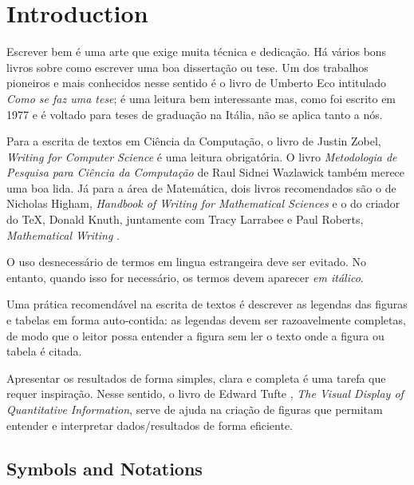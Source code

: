 \chapter{Introduction}
\label{cap:introduction}

Escrever bem é uma arte que exige muita técnica e dedicação. Há vários bons livros
sobre como escrever uma boa dissertação ou tese. Um dos trabalhos pioneiros e mais
conhecidos nesse sentido é o livro de Umberto Eco \cite{eco:09} intitulado 
\emph{Como se faz uma tese}; é uma leitura bem interessante mas, como foi escrito 
em 1977 e é voltado para teses de graduação na Itália, não se aplica tanto a nós.

Para a escrita de textos em Ciência da Computação, o livro de Justin Zobel, 
\emph{Writing for Computer Science} \cite{zobel:04} é uma leitura obrigatória. 
O livro \emph{Metodologia de Pesquisa para Ciência da Computação} de 
Raul Sidnei Wazlawick \cite{waz:09} também merece uma boa lida.
Já para a área de Matemática, dois livros recomendados são o de Nicholas Higham,
\emph{Handbook of Writing for Mathematical Sciences} \cite{Higham:98} e o do criador
do \TeX, Donald Knuth, juntamente com Tracy Larrabee e Paul Roberts, 
\emph{Mathematical Writing} \cite{Knuth:96}.

O uso desnecessário de termos em lingua estrangeira deve ser evitado. No entanto,
quando isso for necessário, os termos devem aparecer \emph{em itálico}.


Uma prática recomendável na escrita de textos é descrever as legendas das
figuras e tabelas em forma auto-contida: as legendas devem ser razoavelmente
completas, de modo que o leitor possa entender a figura sem ler o texto onde a
figura ou tabela é citada.  

Apresentar os resultados de forma simples, clara e completa é uma tarefa que
requer inspiração. Nesse sentido, o livro de Edward Tufte \cite{tufte01:visualDisplay},
\emph{The Visual Display of Quantitative Information}, serve de ajuda na 
criação de figuras que permitam entender e interpretar dados/resultados de forma
eficiente.




\section{Symbols and Notations}
\label{sec:notation}

